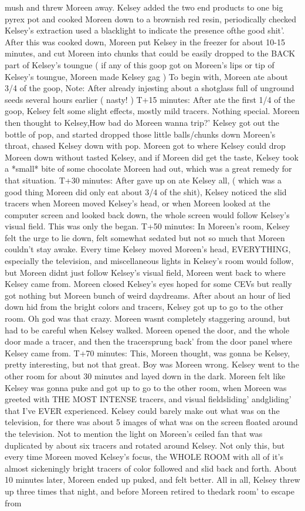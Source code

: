 \documentclass[12pt]{book}
\begin{document}
mush and threw Moreen away. Kelsey added the two end products to one big pyrex pot and cooked Moreen down to a brownish red resin, periodically checked Kelsey's extraction used a blacklight to indicate the presence ofthe good shit'. After this was cooked down, Moreen put Kelsey in the freezer for about 10-15 minutes, and cut Moreen into chunks that could be easily dropped to the BACK part of Kelsey's toungue ( if any of this goop got on Moreen's lips or tip of Kelsey's toungue, Moreen made Kelsey gag ) To begin with, Moreen ate about 3/4 of the goop, Note: After already injesting about a shotglass full of unground seeds several hours earlier ( nasty! ) T+15 minutes: After ate the first 1/4 of the goop, Kelsey felt some slight effects, mostly mild tracers. Nothing special. Moreen then thought to Kelsey,How bad do Moreen wanna trip?' Kelsey got out the bottle of pop, and started dropped those little balls/chunks down Moreen's throat, chased Kelsey down with pop. Moreen got to where Kelsey could drop Moreen down without tasted Kelsey, and if Moreen did get the taste, Kelsey took a *small* bite of some chocolate Moreen had out, which was a great remedy for that situation. T+30 minutes: After gave up on ate Kelsey all, ( which was a good thing Moreen did only eat about 3/4 of the shit), Kelsey noticed the slid tracers when Moreen moved Kelsey's head, or when Moreen looked at the computer screen and looked back down, the whole screen would follow Kelsey's visual field. This was only the began. T+50 minutes: In Moreen's room, Kelsey felt the urge to lie down, felt somewhat sedated but not so much that Moreen couldn't stay awake. Every time Kelsey moved Moreen's head, EVERYTHING, especially the television, and miscellaneous lights in Kelsey's room would follow, but Moreen didnt just follow Kelsey's visual field, Moreen went back to where Kelsey came from. Moreen closed Kelsey's eyes hoped for some CEVs but really got nothing but Moreen bunch of weird daydreams. After about an hour of lied down hid from the bright colors and tracers, Kelsey got up to go to the other room. Oh god was that crazy. Moreen wasnt completely staggering around, but had to be careful when Kelsey walked. Moreen opened the door, and the whole door made a tracer, and then the tracersprung back' from the door panel where Kelsey came from. T+70 minutes: This, Moreen thought, was gonna be Kelsey, pretty interesting, but not that great. Boy was Moreen wrong. Kelsey went to the other room for about 30 minutes and layed down in the dark. Moreen felt like Kelsey was gonna puke and got up to go to the other room, when Moreen was greeted with THE MOST INTENSE tracers, and visual fieldsliding' andgliding' that I've EVER experienced. Kelsey could barely make out what was on the television, for there was about 5 images of what was on the screen floated around the television. Not to mention the light on Moreen's ceiled fan that was duplicated by about six tracers and rotated around Kelsey. Not only this, but every time Moreen moved Kelsey's focus, the WHOLE ROOM with all of it's almost sickeningly bright tracers of color followed and slid back and forth. About 10 minutes later, Moreen ended up puked, and felt better. All in all, Kelsey threw up three times that night, and before Moreen retired to thedark room' to escape from 
\end{document}
